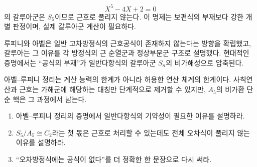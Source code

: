 \begin{example}
\[
  X^5-4X+2=0
\]
의 갈루아군은 $S_5$이므로 근호로 풀리지 않는다. 이 명제는 보편식의 부재보다 강한 개별 판정이며, 실제 갈루아군 계산이 필요하다.
\end{example}

\begin{remark}[역사적 이름]
루피니와 아벨은 일반 고차방정식의 근호공식이 존재하지 않는다는 방향을 확립했고, 갈루아는 그 이유를 각 방정식의 근 순열군과 정상부분군 구조로 설명했다. 현대적인 증명에서는 ``공식의 부재''가 일반다항식의 갈루아군 $S_n$의 비가해성으로 압축된다.
\end{remark}

\begin{keyidea}
아벨--루피니 정리는 계산 능력의 한계가 아니라 허용한 연산 체계의 한계이다. 사칙연산과 근호는 가해군에 해당하는 대칭만 단계적으로 제거할 수 있지만, $A_5$의 비가환 단순 핵은 그 과정에서 남는다.
\end{keyidea}

\begin{checkpoint}
\begin{enumerate}[label=(\alph*)]
  \item 아벨--루피니 정리의 증명에서 일반다항식의 기약성이 필요한 이유를 설명하라.
  \item $S_5/A_5\cong C_2$라는 첫 몫은 근호로 처리할 수 있는데도 전체 오차식이 풀리지 않는 이유를 설명하라.
  \item ``오차방정식에는 공식이 없다''를 더 정확한 한 문장으로 다시 써라.
\end{enumerate}
\end{checkpoint}
